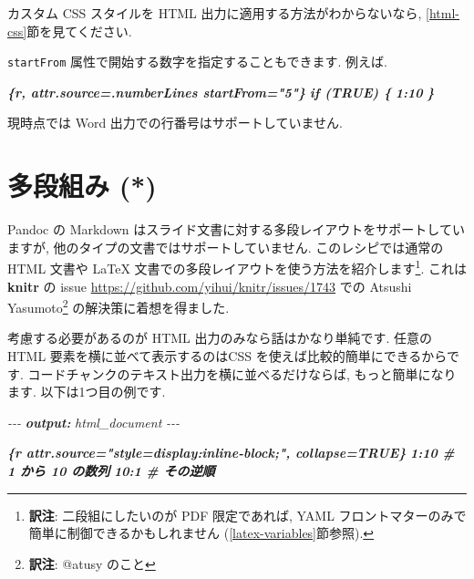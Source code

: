 \documentclass[
  11pt,
  lualatex,ja=standard,jafont=noto]{bxjsreport}
\newenvironment{Shaded}{\begin{snugshade}}{\end{snugshade}}
\newcommand{\AnnotationTok}[1]{\textcolor[rgb]{0.56,0.35,0.01}{\textbf{\textit{#1}}}}
\newcommand{\CommentTok}[1]{\textcolor[rgb]{0.56,0.35,0.01}{\textit{#1}}}
\newcommand{\InformationTok}[1]{\textcolor[rgb]{0.56,0.35,0.01}{\textbf{\textit{#1}}}}
\begin{document}
カスタム CSS スタイルを HTML 出力に適用する方法がわからないなら, \ref{html-css}節を見てください.

\texttt{startFrom} 属性で開始する数字を指定することもできます. 例えば.

\begin{Shaded}
\begin{Highlighting}[]
\InformationTok{\textasciigrave{}\textasciigrave{}\textasciigrave{}\{r, attr.source=\textquotesingle{}.numberLines startFrom="5"\textquotesingle{}\}}
\InformationTok{if (TRUE) \{}
\InformationTok{  1:10}
\InformationTok{\}}
\InformationTok{\textasciigrave{}\textasciigrave{}\textasciigrave{}}
\end{Highlighting}
\end{Shaded}

現時点では Word 出力での行番号はサポートしていません.

\hypertarget{multi-column}{%
\section{多段組み (*)}\label{multi-column}}

Pandoc の Markdown はスライド文書に対する多段レイアウトをサポートしていますが, 他のタイプの文書ではサポートしていません. このレシピでは通常の HTML 文書や LaTeX 文書での多段レイアウトを使う方法を紹介します\footnote{\textbf{訳注}: 二段組にしたいのが PDF 限定であれば, YAML フロントマターのみで簡単に制御できるかもしれません (\ref{latex-variables}節参照).}. これは \textbf{knitr} の issue \url{https://github.com/yihui/knitr/issues/1743} での Atsushi Yasumoto\footnote{\textbf{訳注}: @atusy のこと} の解決策に着想を得ました.

考慮する必要があるのが HTML 出力のみなら話はかなり単純です. 任意の HTML 要素を横に並べて表示するのはCSS を使えば比較的簡単にできるからです. コードチャンクのテキスト出力を横に並べるだけならば, もっと簡単になります. 以下は1つ目の例です.

\begin{Shaded}
\begin{Highlighting}[]
\CommentTok{{-}{-}{-}}
\AnnotationTok{output:}\CommentTok{ html\_document}
\CommentTok{{-}{-}{-}}

\InformationTok{\textasciigrave{}\textasciigrave{}\textasciigrave{}\{r attr.source="style=\textquotesingle{}display:inline{-}block;\textquotesingle{}", collapse=TRUE\}}
\InformationTok{1:10  \# 1 から 10 の数列}
\InformationTok{10:1  \# その逆順}
\InformationTok{\textasciigrave{}\textasciigrave{}\textasciigrave{}}
\end{Highlighting}
\end{Shaded}
\end{document}
